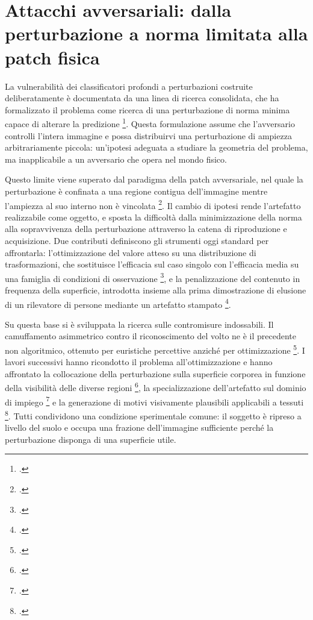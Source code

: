 \documentclass[a4paper,12pt]{report}
\begin{document}
\section{Attacchi avversariali: dalla perturbazione a norma limitata alla patch fisica}
\label{sec:sota_adversarial}

La vulnerabilità dei classificatori profondi a perturbazioni costruite
deliberatamente è documentata da una linea di ricerca consolidata, che ha
formalizzato il problema come ricerca di una perturbazione di norma minima
capace di alterare la predizione \footcite{carlini_2017}. Questa formulazione
assume che l'avversario controlli l'intera immagine e possa distribuirvi una
perturbazione di ampiezza arbitrariamente piccola: un'ipotesi adeguata a
studiare la geometria del problema, ma inapplicabile a un avversario che opera
nel mondo fisico.

Questo limite viene superato dal paradigma della patch avversariale, nel quale
la perturbazione è confinata a una regione contigua dell'immagine mentre
l'ampiezza al suo interno non è vincolata \footcite{brown_2017_patch}. Il
cambio di ipotesi rende l'artefatto realizzabile come oggetto, e sposta la
difficoltà dalla minimizzazione della norma alla sopravvivenza della
perturbazione attraverso la catena di riproduzione e acquisizione. Due
contributi definiscono gli strumenti oggi standard per affrontarla:
l'ottimizzazione del valore atteso su una distribuzione di trasformazioni, che
sostituisce l'efficacia sul caso singolo con l'efficacia media su una famiglia di
condizioni di osservazione \footcite{athalye_2018_eot}, e la penalizzazione del
contenuto in frequenza della superficie, introdotta insieme alla prima
dimostrazione di elusione di un rilevatore di persone mediante un artefatto
stampato \footcite{thys_2019}.

Su questa base si è sviluppata la ricerca sulle contromisure indossabili. Il
camuffamento asimmetrico contro il riconoscimento del volto ne è il precedente
non algoritmico, ottenuto per euristiche percettive anziché per ottimizzazione
\footcite{harvey_2010}. I lavori successivi hanno ricondotto il problema
all'ottimizzazione e hanno affrontato la collocazione della perturbazione sulla
superficie corporea in funzione della visibilità delle diverse regioni
\footcite{huang_2020_upc}, la specializzazione dell'artefatto sul dominio di
impiego \footcite{wu_2020} e la generazione di motivi visivamente plausibili
applicabili a tessuti \footcite{hu_2022}. Tutti condividono una condizione
sperimentale comune: il soggetto è ripreso a livello del suolo e occupa una
frazione dell'immagine sufficiente perché la perturbazione disponga di una
superficie utile.
\end{document}
